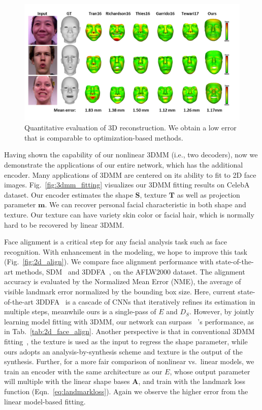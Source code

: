 \begin{figure}[t!]
\centering
\includegraphics[trim=10 22 25 12,clip,width=\linewidth]{img/3D_rescon_quan.png}
\vspace{-4mm}
\caption{\small Quantitative evaluation of 3D reconstruction. We obtain a low error that is comparable to optimization-based methods.}
\label{fig:3d_rescon_quan}
\figvspace 
\end{figure}



Having shown the capability of our nonlinear 3DMM (i.e., two decoders), now we demonstrate the applications of our entire network, which has the additional encoder.
Many applications of 3DMM are centered on its ability to fit to 2D face images.
%
Fig.~\ref{fig:3dmm_fitting} visualizes our 3DMM fitting results on CelebA dataset. 
Our encoder estimates the shape $\mathbf{S}$, texture $\mathbf{T}$ as well as projection parameter $\mathbf{m}$. 
We can recover personal facial characteristic in both shape and texture. 
Our texture can have variety skin color or facial hair, which is normally hard to be recovered by linear 3DMM.

Face alignment is a critical step for any facial analysis task such as face recognition. 
With enhancement in the modeling, we hope to improve this task (Fig.~\ref{fig:2d_align}). 
We compare face alignment performance with state-of-the-art methods, SDM~\cite{yan2013learn} and 3DDFA~\cite{zhu2016face}, on the AFLW2000 dataset. 
The alignment accuracy is evaluated by the Normalized Mean Error (NME), the average of visible landmark error normalized by the bounding box size.
Here, current state-of-the-art 3DDFA~\cite{zhu2016face} is a cascade of CNNs that iteratively refines its estimation in multiple steps, meanwhile ours is a single-pass of $E$ and $D_S$. 
However, by jointly learning model fitting with 3DMM, our network can surpass ~\cite{zhu2016face}'s performance, as in Tab.~\ref{tab:2d_face_align}.
Another perspective is that in conventional 3DMM fitting~\cite{zhu2016face}, the texture is used as the input to regress the shape parameter, while ours adopts an analysis-by-synthesis scheme and texture is the output of the synthesis.
Further, for a more fair comparison of nonlinear vs.~linear models, we train an encoder with the same architecture as our $E$, whose output parameter will multiple with the linear shape bases $\mathbf{A}$, and train with the landmark loss function (Eqn.~\ref{eq:landmarkloss}). 
Again we observe the higher error from the linear model-based fitting.

